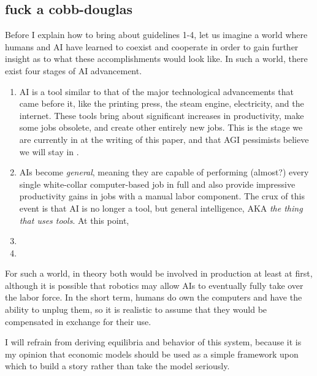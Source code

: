 \documentclass{article}[10pt]
\begin{document}
\subsection{fuck a cobb-douglas}

Before I explain how to bring about guidelines 1-4, let us imagine a world where humans and AI have learned to coexist and cooperate in order to gain further insight as to what these accomplishments would look like.
In such a world, there exist four stages of AI advancement.\par
\begin{enumerate}
    \item AI is a tool similar to that of the major technological advancements that came before it, like the printing press, the steam engine, electricity, and the internet.
    These tools bring about significant increases in productivity, make some jobs obsolete, and create other entirely new jobs.
    This is the stage we are currently in at the writing of this paper, and that AGI pessimists believe we will stay in \cite{jobIsSafe}.
    \item AIs become \textit{general}, meaning they are capable of performing (almost?) every single white-collar computer-based job in full and also provide impressive productivity gains in jobs with a manual labor component.
    The crux of this event is that AI is no longer a tool, but general intelligence, AKA \textit{the thing that uses tools}.
    At this point,
    \item 
    \item 
\end{enumerate}

For such a world, in theory both would be involved in production at least at first, although it is possible that robotics may allow AIs to eventually fully take over the labor force.
In the short term, humans do own the computers and have the ability to unplug them, so it is realistic to assume that they would be compensated in exchange for their use.\par

I will refrain from deriving equilibria and behavior of this system, because it is my opinion that economic models should be used as a simple framework upon which to build a story rather than take the model seriously.\par
\end{document}
